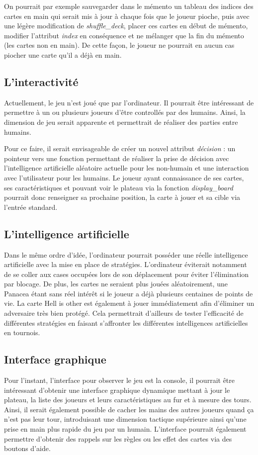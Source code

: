 \documentclass[12pt]{article}
\begin{document}
On pourrait par exemple sauvegarder dans le mémento un tableau des indices des cartes en main qui serait mis à jour à chaque fois que le joueur pioche, puis avec une légère modification de \textit{shuffle\_deck},
placer ces cartes en début de mémento, modifier l'attribut \textit{index} en conséquence et ne mélanger que la fin du mémento (les cartes non en main).
De cette façon, le joueur ne pourrait en aucun cas piocher une carte qu'il a déjà en main.

\subsection{L'interactivité}
Actuellement, le jeu n'est joué que par l'ordinateur. Il pourrait être intéressant de permettre à un ou plusieurs joueurs d'être controllés par des humains.
Ainsi, la dimension de jeu serait apparente et permettrait de réaliser des parties entre humains.

Pour ce faire, il serait envisageable de créer un nouvel attribut \textit{décision} : un pointeur vers une fonction permettant de réaliser la prise de décision avec l'intelligence artificielle aléatoire actuelle pour les non-humain et une interaction avec l'utilisateur pour les humains.
Le joueur ayant connaissance de ses cartes, ses caractéristiques et pouvant voir le plateau via la fonction \textit{display\_board} pourrait donc renseigner sa prochaine position, la carte à jouer et sa cible via l'entrée standard.

\subsection{L'intelligence artificielle}
Dans le même ordre d'idée, l'ordinateur pourrait posséder une réelle intelligence artificielle avec la mise en place de stratégies.
L'ordinateur éviterait notamment de se coller aux cases occupées lors de son déplacement pour éviter l'élimination par blocage.
De plus, les cartes ne seraient plus jouées aléatoirement, une Panacea étant sans réel intérêt si le joueur a déjà plusieurs centaines de points de vie.
La carte Hell is other est également à jouer immédiatement afin d'éliminer un adversaire très bien protégé.
Cela permettrait d'ailleurs de tester l'efficacité de différentes stratégies en faisant s'affronter les différentes intelligences artificielles en tournois.

\subsection{Interface graphique}
Pour l'instant, l'interface pour observer le jeu est la console, il pourrait être intéressant d'obtenir une interface graphique dynamique mettant à jour le plateau, la liste des joueurs et leurs caractéristiques au fur et à mesure des tours.
Ainsi, il serait également possible de cacher les mains des autres joueurs quand ça n'est pas leur tour, introduisant une dimension tactique supérieure ainsi qu'une prise en main plus rapide du jeu par un humain.
L'interface pourrait également permettre d'obtenir des rappels sur les règles ou les effet des cartes via des boutons d'aide.
\end{document}
